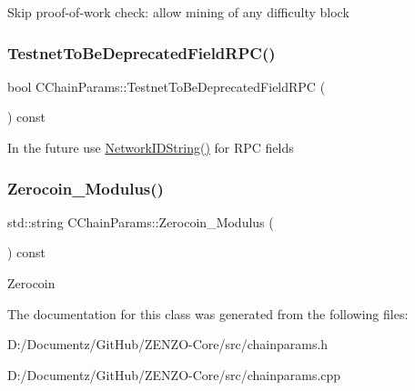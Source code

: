Skip proof-\/of-\/work check\+: allow mining of any difficulty block \mbox{\label{class_c_chain_params_a1552cea0636112ef84069cd6b7858b8e}} 
\subsubsection{\texorpdfstring{TestnetToBeDeprecatedFieldRPC()}{TestnetToBeDeprecatedFieldRPC()}}
{\footnotesize\ttfamily bool C\+Chain\+Params\+::\+Testnet\+To\+Be\+Deprecated\+Field\+R\+PC (\begin{DoxyParamCaption}{ }\end{DoxyParamCaption}) const\hspace{0.3cm}{\ttfamily [inline]}}

In the future use \mbox{\hyperlink{class_c_chain_params_a2c02cc73f7fe9369cee9a39a0fd5b710}{Network\+I\+D\+String()}} for R\+PC fields \mbox{\label{class_c_chain_params_af6003afc48876c16e825f589eed0ff11}} 
\subsubsection{\texorpdfstring{Zerocoin\_Modulus()}{Zerocoin\_Modulus()}}
{\footnotesize\ttfamily std\+::string C\+Chain\+Params\+::\+Zerocoin\+\_\+\+Modulus (\begin{DoxyParamCaption}{ }\end{DoxyParamCaption}) const\hspace{0.3cm}{\ttfamily [inline]}}

Zerocoin 

The documentation for this class was generated from the following files\+:\begin{DoxyCompactItemize}
\item 
D\+:/\+Documentz/\+Git\+Hub/\+Z\+E\+N\+Z\+O-\/\+Core/src/chainparams.\+h\item 
D\+:/\+Documentz/\+Git\+Hub/\+Z\+E\+N\+Z\+O-\/\+Core/src/chainparams.\+cpp\end{DoxyCompactItemize}

